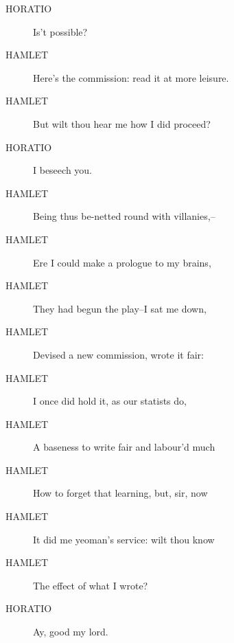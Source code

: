\documentclass{article}
\begin{document}
\begin{description}
            
\item[HORATIO] Is't possible?
\end{description}
          
\begin{description}
            
\item[HAMLET] Here's the commission: read it at more leisure.
\item[HAMLET] But wilt thou hear me how I did proceed?
\end{description}
          
\begin{description}
            
\item[HORATIO] I beseech you.
\end{description}
          
\begin{description}
            
\item[HAMLET] Being thus be-netted round with villanies,--
\item[HAMLET] Ere I could make a prologue to my brains,
\item[HAMLET] They had begun the play--I sat me down,
\item[HAMLET] Devised a new commission, wrote it fair:
\item[HAMLET] I once did hold it, as our statists do,
\item[HAMLET] A baseness to write fair and labour'd much
\item[HAMLET] How to forget that learning, but, sir, now
\item[HAMLET] It did me yeoman's service: wilt thou know
\item[HAMLET] The effect of what I wrote?
\end{description}
          
\begin{description}
            
\item[HORATIO] Ay, good my lord.
\end{description}
          
\end{document}
